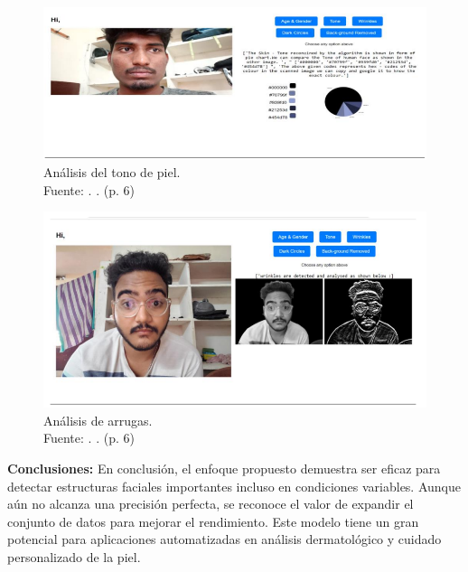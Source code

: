 \begin{figure}[!ht]
	\begin{center}
		\includegraphics[width=1\textwidth]{2/figures/softres2.png}
		\caption[Análisis del tono de piel]{Análisis del tono de piel.\\
			Fuente: \cite{Tamilkodi2024}. . (p. 6)}
		\label{2:fig9}
	\end{center}
\end{figure}

\begin{figure}[!ht]
	\begin{center}
		\includegraphics[width=1\textwidth]{2/figures/softres3.png}
		\caption[Análisis de arrugas]{Análisis de arrugas.\\
			Fuente: \cite{Tamilkodi2024}. . (p. 6)}
		\label{2:fig10}
	\end{center}
\end{figure}

\textbf{Conclusiones:}
En conclusión, el enfoque propuesto demuestra ser eficaz para detectar estructuras faciales importantes incluso en condiciones variables. Aunque aún no alcanza una precisión perfecta, se reconoce el valor de expandir el conjunto de datos para mejorar el rendimiento. Este modelo tiene un gran potencial para aplicaciones automatizadas en análisis dermatológico y cuidado personalizado de la piel.

